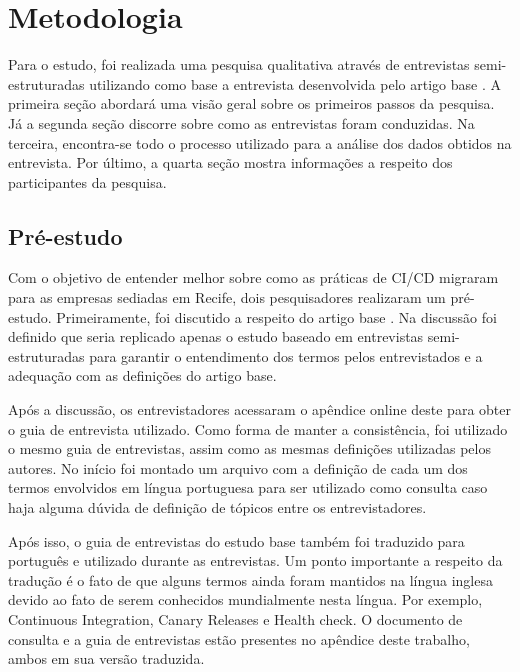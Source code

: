 
\chapter{Metodologia}

Para o estudo, foi realizada uma pesquisa qualitativa através de entrevistas semi-estruturadas utilizando como base a entrevista desenvolvida pelo artigo base \cite{empiricalStudy2016}. A primeira seção abordará uma visão geral sobre os primeiros passos da pesquisa.  Já a segunda seção discorre sobre como as entrevistas foram conduzidas. Na terceira, encontra-se todo o processo utilizado para a análise dos dados obtidos na entrevista. Por último, a quarta seção mostra informações a respeito dos participantes da pesquisa.


\section{Pré-estudo}

Com o objetivo de entender melhor sobre como as práticas de CI/CD migraram para as empresas sediadas em Recife, dois pesquisadores realizaram um pré-estudo. Primeiramente, foi discutido a respeito do artigo base \cite{empiricalStudy2016}. Na discussão foi definido que seria replicado apenas o estudo baseado em entrevistas semi-estruturadas para garantir o entendimento dos termos pelos entrevistados e a adequação com as definições do artigo base. 

Após a discussão, os entrevistadores acessaram o apêndice online deste \cite{empiricalStudyOnlineAppendix} para obter o guia de entrevista utilizado. Como forma de manter a consistência, foi utilizado o mesmo guia de entrevistas, assim como as mesmas definições utilizadas pelos autores. No início foi montado um arquivo com a definição de cada um dos termos envolvidos em língua portuguesa para ser utilizado como consulta caso haja alguma dúvida de definição de tópicos entre os entrevistadores.

Após isso, o guia de entrevistas do estudo base \cite{empiricalStudyOnlineAppendix} também foi traduzido para português e utilizado durante as entrevistas. Um ponto importante a respeito da tradução é o fato de que alguns termos ainda foram mantidos na língua inglesa devido ao fato de serem conhecidos mundialmente nesta língua. Por exemplo, Continuous Integration, Canary Releases e Health check.
O documento de consulta e a guia de entrevistas estão presentes no apêndice deste trabalho, ambos em sua versão traduzida.

